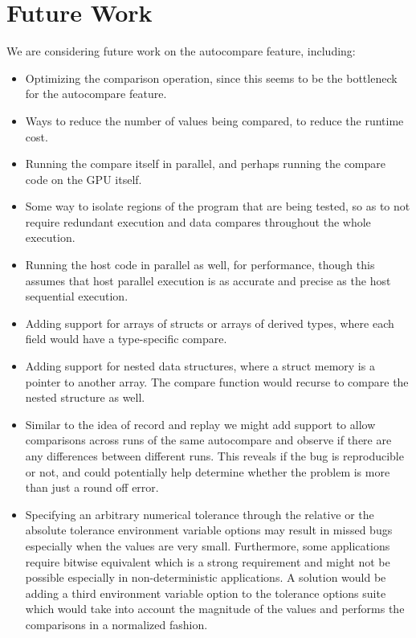 \section{Future Work}

We are considering future work on the autocompare feature, including:
\begin{itemize}
\item Optimizing the comparison operation, since this seems to be the bottleneck for the autocompare feature.
\item Ways to reduce the number of values being compared, to reduce the runtime cost.
\item Running the compare itself in parallel, and perhaps running the compare code on the GPU itself.
\item Some way to isolate regions of the program that are being tested, so as to not require redundant execution and data compares throughout the whole execution.
\item Running the host code in parallel as well, for performance, though this assumes that host parallel execution is as accurate and precise as the host sequential execution.
\item Adding support for arrays of structs or arrays of derived types, where each field would have a type-specific compare.
\item Adding support for nested data structures, where a struct memory is a pointer to another array.
The compare function would recurse to compare the nested structure as well.
\item Similar to the idea of record and replay \cite{sato2015clock} we might add support to allow comparisons across runs of the same autocompare and observe if there are any differences between different runs. This reveals if the bug is reproducible or not, and could potentially help determine whether the problem is more than just a round off error. 
\item Specifying an arbitrary numerical tolerance through the relative or the absolute tolerance environment variable options may result in missed bugs especially when the values are very small. Furthermore, some applications require bitwise equivalent which is a strong requirement and might not be possible especially in non-deterministic applications. A solution would be adding a third environment variable option to the tolerance options suite which would take into account the magnitude of the values and performs the comparisons in a normalized fashion. 
\end{itemize}

